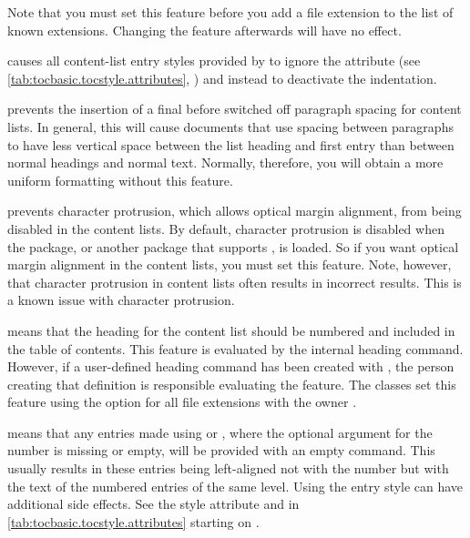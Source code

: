 \begin{description}
  Note that you must set this feature before you add a
  file extension to the list of known extensions. Changing the feature
  afterwards will have no effect.
\item[\PValue{noindent}]%
  causes all content-list entry styles provided by \KOMAScript{} to ignore
  the  attribute (see
  \autoref{tab:tocbasic.tocstyle.attributes},
  ) and instead to
  deactivate the indentation.%
\item[\PValue{noparskipfake}] prevents
  the insertion of a final  before switched off paragraph
  spacing for content lists. In general, this will cause documents that use
  spacing between paragraphs to have less vertical space between the list
  heading and first entry than between normal headings and normal text.
  Normally, therefore, you will obtain a more uniform formatting without this
  feature.
\item[\PValue{noprotrusion}] prevents
  character protrusion, which allows optical margin alignment, from being
  disabled in the content lists. By default, character protrusion is disabled
  when the  package, or another
  package that supports , is
  loaded. So if you want optical margin alignment in the content lists, you
  must set this feature. Note, however, that character
  protrusion in content lists often results in incorrect results. This is a
  known issue with character protrusion.
\item[\PValue{numbered}] means that the heading for the content list should
  be numbered and included in the table of contents. This feature is evaluated
  by the internal heading command. However, if a user-defined heading command
  has been created with , the person
  creating that definition is responsible evaluating the feature. The
  \KOMAScript{} classes set this feature using the
   option for all file extensions
  with the owner .
\item[\PValue{numberline}] \leavevmode{}%
  means that any entries made using 
  or , where the
  optional argument for the number is missing or empty, will be provided with
  an empty  command. This usually results
  in these entries being left-aligned not with the number but with the text of
  the numbered entries of the same level.
  Using the  entry style
  can have additional side effects. See the style attribute
   and  in
  \autoref{tab:tocbasic.tocstyle.attributes} starting on
  .


\end{description}
